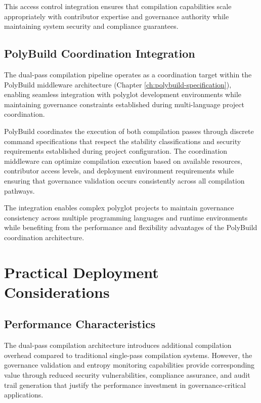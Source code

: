 This access control integration ensures that compilation capabilities scale appropriately with contributor expertise and governance authority while maintaining system security and compliance guarantees.

\subsection{PolyBuild Coordination Integration}

The dual-pass compilation pipeline operates as a coordination target within the PolyBuild middleware architecture (Chapter \ref{ch:polybuild-specification}), enabling seamless integration with polyglot development environments while maintaining governance constraints established during multi-language project coordination.

PolyBuild coordinates the execution of both compilation passes through discrete command specifications that respect the stability classifications and security requirements established during project configuration. The coordination middleware can optimize compilation execution based on available resources, contributor access levels, and deployment environment requirements while ensuring that governance validation occurs consistently across all compilation pathways.

The integration enables complex polyglot projects to maintain governance consistency across multiple programming languages and runtime environments while benefiting from the performance and flexibility advantages of the PolyBuild coordination architecture.

\section{Practical Deployment Considerations}

\subsection{Performance Characteristics}

The dual-pass compilation architecture introduces additional compilation overhead compared to traditional single-pass compilation systems. However, the governance validation and entropy monitoring capabilities provide corresponding value through reduced security vulnerabilities, compliance assurance, and audit trail generation that justify the performance investment in governance-critical applications.

